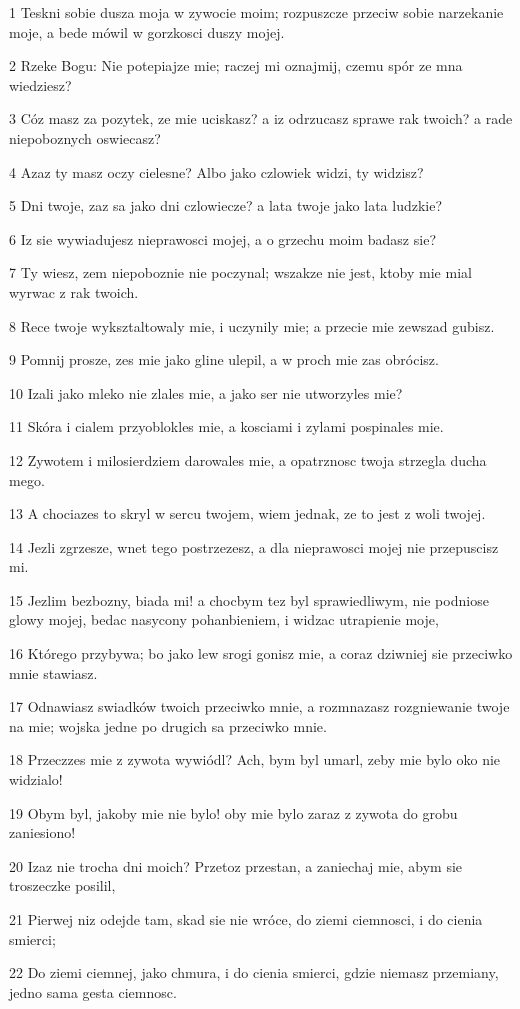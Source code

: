 \par 1 Teskni sobie dusza moja w zywocie moim; rozpuszcze przeciw sobie narzekanie moje, a bede mówil w gorzkosci duszy mojej.
\par 2 Rzeke Bogu: Nie potepiajze mie; raczej mi oznajmij, czemu spór ze mna wiedziesz?
\par 3 Cóz masz za pozytek, ze mie uciskasz? a iz odrzucasz sprawe rak twoich? a rade niepoboznych oswiecasz?
\par 4 Azaz ty masz oczy cielesne? Albo jako czlowiek widzi, ty widzisz?
\par 5 Dni twoje, zaz sa jako dni czlowiecze? a lata twoje jako lata ludzkie?
\par 6 Iz sie wywiadujesz nieprawosci mojej, a o grzechu moim badasz sie?
\par 7 Ty wiesz, zem niepoboznie nie poczynal; wszakze nie jest, ktoby mie mial wyrwac z rak twoich.
\par 8 Rece twoje wyksztaltowaly mie, i uczynily mie; a przecie mie zewszad gubisz.
\par 9 Pomnij prosze, zes mie jako gline ulepil, a w proch mie zas obrócisz.
\par 10 Izali jako mleko nie zlales mie, a jako ser nie utworzyles mie?
\par 11 Skóra i cialem przyoblokles mie, a kosciami i zylami pospinales mie.
\par 12 Zywotem i milosierdziem darowales mie, a opatrznosc twoja strzegla ducha mego.
\par 13 A chociazes to skryl w sercu twojem, wiem jednak, ze to jest z woli twojej.
\par 14 Jezli zgrzesze, wnet tego postrzezesz, a dla nieprawosci mojej nie przepuscisz mi.
\par 15 Jezlim bezbozny, biada mi! a chocbym tez byl sprawiedliwym, nie podniose glowy mojej, bedac nasycony pohanbieniem, i widzac utrapienie moje,
\par 16 Którego przybywa; bo jako lew srogi gonisz mie, a coraz dziwniej sie przeciwko mnie stawiasz.
\par 17 Odnawiasz swiadków twoich przeciwko mnie, a rozmnazasz rozgniewanie twoje na mie; wojska jedne po drugich sa przeciwko mnie.
\par 18 Przeczzes mie z zywota wywiódl? Ach, bym byl umarl, zeby mie bylo oko nie widzialo!
\par 19 Obym byl, jakoby mie nie bylo! oby mie bylo zaraz z zywota do grobu zaniesiono!
\par 20 Izaz nie trocha dni moich? Przetoz przestan, a zaniechaj mie, abym sie troszeczke posilil,
\par 21 Pierwej niz odejde tam, skad sie nie wróce, do ziemi ciemnosci, i do cienia smierci;
\par 22 Do ziemi ciemnej, jako chmura, i do cienia smierci, gdzie niemasz przemiany, jedno sama gesta ciemnosc.


